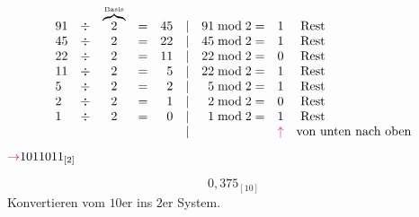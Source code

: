 \documentclass{article}
\begin{document}
\begin{answer}[Lösung]
    \begin{align*}
        \begin{array}{lcccrlrrl}
            91 & \div & \overset{\text{\tiny Basis}}{\overbrace{2}} & = & 45 & | & 91 \bmod 2 = & 1                               & \text{ Rest}               \\
            45 & \div & 2                                           & = & 22 & | & 45 \bmod 2 = & 1                               & \text{ Rest}               \\
            22 & \div & 2                                           & = & 11 & | & 22 \bmod 2 = & 0                               & \text{ Rest}               \\
            11 & \div & 2                                           & = & 5  & | & 22 \bmod 2 = & 1                               & \text{ Rest}               \\
            5  & \div & 2                                           & = & 2  & | & 5 \bmod 2 =  & 1                               & \text{ Rest}               \\
            2  & \div & 2                                           & = & 1  & | & 2 \bmod 2 =  & 0                               & \text{ Rest}               \\
            1  & \div & 2                                           & = & 0  & | & 1 \bmod 2 =  & 1                               & \text{ Rest}               \\
               &      &                                             &   &    & | &              & \textcolor{RubineRed}{\uparrow} & \text{von unten nach oben} \\
        \end{array}
    \end{align*}
    $\textcolor{RubineRed}{\rightarrow} 1011011_{[2]}$
\end{answer}


\begin{question}[Nachkommastellen]
    \begin{equation*}
        0,375_{[10]}
    \end{equation*}
    Konvertieren vom $10$er ins $2$er System.
\end{question}
\end{document}
